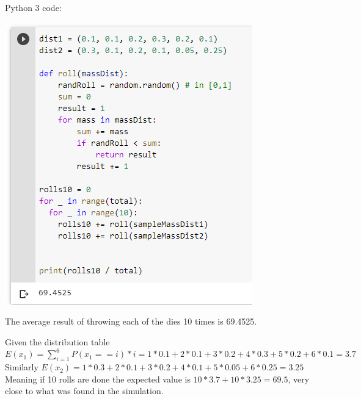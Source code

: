 \documentclass{article}
\begin{document}
\begin{enumerate}[1.]
Python 3 code: \\
\begin{center}
\includegraphics{a3_q4}
\end{center}

The average result of throwing each of the dies 10 times is 69.4525. 

Given the distribution table $E(x_1) = \sum_{i = 1}^{6}{P(x_1 == i) * i} = 1 * 0.1 + 2 * 0.1 + 3 * 0.2 + 4 * 0.3 + 5 * 0.2 + 6 * 0.1 = 3.7$ \\
Similarly $E(x_2) = 1 * 0.3 + 2 * 0.1 + 3 * 0.2 + 4 * 0.1 + 5 * 0.05 + 6 * 0.25 = 3.25$ \\
Meaning if 10 rolls are done the expected value is $10 * 3.7 + 10 * 3.25 = 69.5$, very close to what was found in the simulation. 

\end{enumerate}
\end{document}
